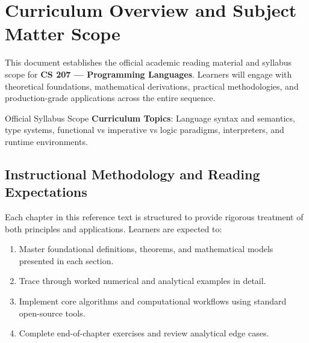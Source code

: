 \section{Curriculum Overview and Subject Matter Scope}

This document establishes the official academic reading material and syllabus scope for \textbf{CS 207 --- Programming Languages}. Learners will engage with theoretical foundations, mathematical derivations, practical methodologies, and production-grade applications across the entire sequence.

\begin{InsightBox}{Official Syllabus Scope}
  \textbf{Curriculum Topics}: Language syntax and semantics, type systems, functional vs imperative vs logic paradigms, interpreters, and runtime environments.
\end{InsightBox}

\subsection{Instructional Methodology and Reading Expectations}

Each chapter in this reference text is structured to provide rigorous treatment of both principles and applications. Learners are expected to:
\begin{enumerate}
  \item Master foundational definitions, theorems, and mathematical models presented in each section.
  \item Trace through worked numerical and analytical examples in detail.
  \item Implement core algorithms and computational workflows using standard open-source tools.
  \item Complete end-of-chapter exercises and review analytical edge cases.
\end{enumerate}

